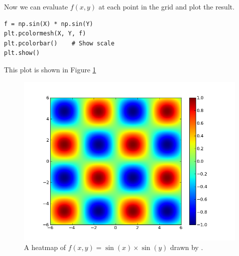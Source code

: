 Now we can evaluate $f(x,y)$ at each point in the grid and plot the result.
\begin{lstlisting}
f = np.sin(X) * np.sin(Y)
plt.pcolormesh(X, Y, f)
plt.pcolorbar()    # Show scale
plt.show()
\end{lstlisting}
This plot is shown in Figure \ref{fig:pcmexample}
\begin{figure}
\includegraphics[width=.7\textwidth]{sinxsiny.png}
\caption{A heatmap of $f(x,y)=\sin\left(x\right)\times\sin\left(y\right)$ drawn by .}
\label{fig:pcmexample}
\end{figure}

